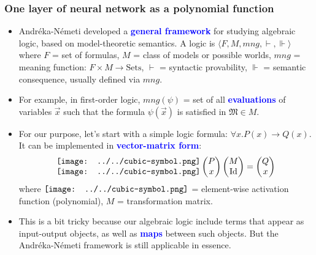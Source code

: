 \documentclass[16pt]{beamer}
\let\oldtextbf\textbf
\renewcommand{\textbf}[1]{\textcolor{blue}{\oldtextbf{#1}}}
\newcommand{\cubic}{\vcenter{\hbox{\texttt{[image: ../../cubic-symbol.png]}}}}
\begin{document}
\begin{frame}
\frametitle{One layer of neural network as a polynomial function}
\fontsize{10pt}{8}\selectfont
\begin{itemize}
	\item Andr\'{e}ka-N\'{e}meti \cite{Andreka2021} developed a \textbf{general framework} for studying algebraic logic, based on model-theoretic semantics.  A logic is $\langle F, M, mng, \vdash, \Vdash \rangle$ where $F$ = set of formulas, $M$ = class of models or possible worlds, $mng$ = meaning function: $F \times M \rightarrow \mathrm{Sets}$, $\vdash$ = syntactic provability, $\Vdash$ = semantic consequence, usually defined via $mng$.
	
	\item For example, in first-order logic, $mng(\psi)$ = set of all \textbf{evaluations} of variables $\vec{x}$ such that the formula $\psi(\vec{x})$ is satisfied in $\mathfrak{M} \in M$.

	\item For our purpose, let's start with a simple logic formula: $\forall x. P(x) \rightarrow Q(x)$.  It can be implemented in \textbf{vector-matrix form}:
	\begin{gather}
	\begin{matrix} \cubic \\ \cubic \end{matrix}
	\begin{pmatrix} P \\ x \end{pmatrix}
	\begin{pmatrix} M \\ \mathrm{Id} \end{pmatrix}
	= \begin{pmatrix} Q \\ x \end{pmatrix}
	\nonumber
	\end{gather}
	where $\cubic$ = element-wise activation function (polynomial), $M$ = transformation matrix.
	
	\item This is a bit tricky because our algebraic logic include terms that appear as input-output objects, as well as \textbf{maps} between such objects.  But the Andr\'{e}ka-N\'{e}meti framework is still applicable in essence.
\end{itemize}
\end{frame}
\end{document}
